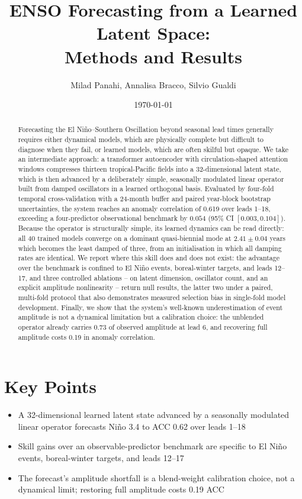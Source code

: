 \documentclass[11pt]{article}
\title{ENSO Forecasting from a Learned Latent Space:\\
Methods and Results}
\author{Milad Panahi, Annalisa Bracco, Silvio Gualdi}
\date{\today}
\begin{document}
\maketitle

\section*{Key Points}
\begin{itemize}
  \item A 32-dimensional learned latent state advanced by a seasonally modulated linear
        operator forecasts Ni\~no 3.4 to ACC 0.62 over leads 1--18
  \item Skill gains over an observable-predictor benchmark are specific to El Ni\~no events,
        boreal-winter targets, and leads 12--17
  \item The forecast's amplitude shortfall is a blend-weight calibration choice, not a
        dynamical limit; restoring full amplitude costs 0.19 ACC
\end{itemize}

\begin{abstract}
Forecasting the El Ni\~no--Southern Oscillation beyond seasonal lead times generally requires
either dynamical models, which are physically complete but difficult to diagnose when they
fail, or learned models, which are often skilful but opaque. We take an intermediate approach:
a transformer autoencoder with circulation-shaped attention windows compresses thirteen
tropical-Pacific fields into a 32-dimensional latent state, which is then advanced by a
deliberately simple, seasonally modulated linear operator built from damped oscillators in a
learned orthogonal basis. Evaluated by four-fold temporal cross-validation with a 24-month
buffer and paired year-block bootstrap uncertainties, the system reaches an anomaly
correlation of 0.619 over leads 1--18, exceeding a four-predictor observational benchmark by
$0.054$ (95\% CI $[0.003, 0.104]$). Because the operator is structurally simple, its learned
dynamics can be read directly: all 40 trained models converge on a dominant quasi-biennial
mode at $2.41\pm0.04$ years which becomes the least damped of three, from an initialisation in
which all damping rates are identical. We report where this skill does and does not exist: the
advantage over the benchmark is confined to El Ni\~no events, boreal-winter targets, and leads
12--17, and three controlled ablations -- on latent dimension, oscillator count, and an
explicit amplitude nonlinearity -- return null results, the latter two under a paired,
multi-fold protocol that also demonstrates measured selection bias in single-fold model
development. Finally, we show that the system's well-known underestimation of event amplitude
is not a dynamical limitation but a calibration choice: the unblended operator already carries
0.73 of observed amplitude at lead 6, and recovering full amplitude costs 0.19 in anomaly
correlation.
\end{abstract}
\end{document}
